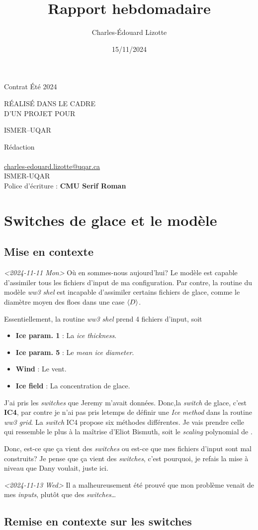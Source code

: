 \documentclass[10pt]{article}
\author{Charles-Édouard Lizotte}
\date{15/11/2024}
\title{Rapport hebdomadaire}
\makeatletter
\numberwithin{equation}{section}
\newcommand{\mytitlepage}{
\begin{titlepage}
\begin{center}
{\Huge \thesubtitle \par}
\vspace{2cm}
{\Huge \MakeUppercase{\thetitle} \par}
\vspace{2cm}
RÉALISÉ DANS LE CADRE\\ D'UN PROJET POUR \par
\vspace{2cm}
{\Huge ISMER--UQAR \par}
\vspace{2cm}
{\thedate}
\end{center}
\vfill
Rédaction \\
{\theauthor}\\
\url{charles-edouard.lizotte@uqar.ca}\\
ISMER-UQAR\\
Police d'écriture : \textbf{CMU Serif Roman}
\end{titlepage}
}
\newcommand{\thesubtitle}{Contrat Été 2024}
\makeatother
\begin{document}
\mytitlepage
\tableofcontents\newpage
\section{Switches de glace et le modèle}
\label{sec:orga7e46d6}

\subsection{Mise en contexte}
\label{sec:org17366ad}

\textit{<2024-11-11 Mon> } Où en sommes-nous aujourd'hui? Le modèle est capable d'assimiler tous les fichiers d'input de ma configuration. Par contre, la routine du modèle \emph{ww3 shel} est incapable d'assimiler certains fichiers de glace, comme le diamètre moyen des floes dans une case \(\expval{D}\).\bigskip

Essentiellement, la routine \emph{ww3 shel} prend 4 fichiers d'input, soit
\begin{itemize}
\item \textbf{Ice param. 1} : La \emph{ice thickness}.
\item \textbf{Ice param. 5} : Le \emph{mean ice diameter}.
\item \textbf{Wind} : Le vent.
\item \textbf{Ice field} : La concentration de glace.
\end{itemize}

J'ai pris les \emph{switches} que Jeremy m'avait données. Donc,la \emph{switch} de glace, c'est \textbf{IC4}, par contre je n'ai pas pris letemps de définir une \emph{Ice method} dans la routine \emph{ww3 grid}. La \emph{switch} IC4 propose six méthodes différentes. Je vais prendre celle qui ressemble le plus à la maîtrise d'Eliot Bismuth, soit le \emph{scaling} polynomial de \Textcite{kohout2008elastic}.\bigskip

Donc, est-ce que ça vient des \emph{switches} ou est-ce que mes fichiers d'input sont mal construits? Je pense que ça vient des \emph{switches}, c'est pourquoi, je refais la mise à niveau que Dany voulait, juste ici. \medskip

\textit{<2024-11-13 Wed> } Il a malheureusement été prouvé que mon problème venait de mes \emph{inputs}, plutôt que des \emph{switches}\ldots{}
\subsection{Remise en contexte sur les switches}
\label{sec:orgb72351f}
\end{document}

